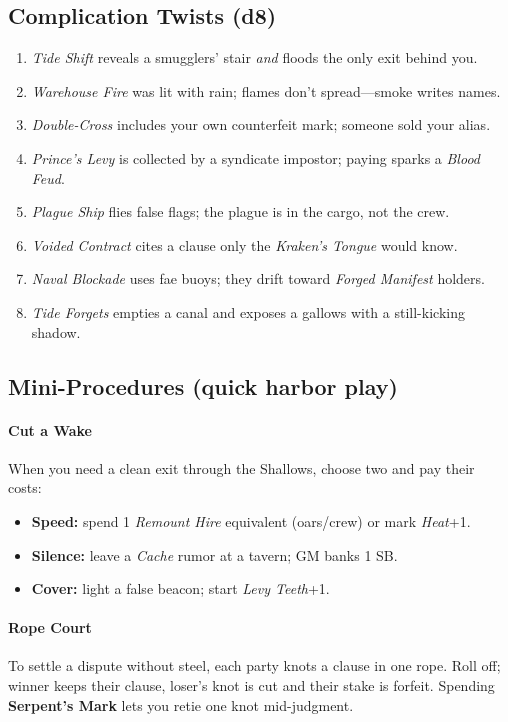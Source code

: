 \subsection*{Complication Twists (d8)}
\begin{enumerate}
  \item \emph{Tide Shift} reveals a smugglers’ stair \emph{and} floods the only exit behind you.
  \item \emph{Warehouse Fire} was lit with rain; flames don’t spread—smoke writes names.
  \item \emph{Double-Cross} includes your own counterfeit mark; someone sold your alias.
  \item \emph{Prince’s Levy} is collected by a syndicate impostor; paying sparks a \emph{Blood Feud}.
  \item \emph{Plague Ship} flies false flags; the plague is in the cargo, not the crew.
  \item \emph{Voided Contract} cites a clause only the \emph{Kraken’s Tongue} would know.
  \item \emph{Naval Blockade} uses fae buoys; they drift toward \emph{Forged Manifest} holders.
  \item \emph{Tide Forgets} empties a canal and exposes a gallows with a still-kicking shadow. 
\end{enumerate}

\subsection*{Mini-Procedures (quick harbor play)}
\paragraph{Cut a Wake}
When you need a clean exit through the Shallows, choose two and pay their costs:
\begin{itemize}
  \item \textbf{Speed:} spend 1 \emph{Remount Hire} equivalent (oars/crew) or mark \emph{Heat}+1.
  \item \textbf{Silence:} leave a \emph{Cache} rumor at a tavern; GM banks 1 SB.
  \item \textbf{Cover:} light a false beacon; start \emph{Levy Teeth}+1.
\end{itemize}

\paragraph{Rope Court}
To settle a dispute without steel, each party knots a clause in one rope.  
Roll off; winner keeps their clause, loser’s knot is cut and their stake is forfeit.  
Spending \textbf{Serpent’s Mark} lets you retie one knot mid-judgment.

